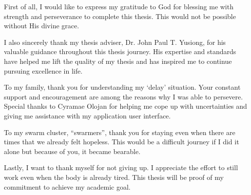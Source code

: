 
First of all, I would like to express my gratitude to God for blessing me with strength and perseverance to complete this thesis. This would not be possible without His divine grace. 

I also sincerely thank my thesis adviser, Dr. John Paul T. Yusiong, for his valuable guidance throughout this thesis journey. His expertise and standards have helped me lift the quality of my thesis and has inspired me to continue pursuing excellence in life. 

To my family, thank you for understanding my `delay' situation. Your constant support and encouragement are among the reasons why I was able to persevere. Special thanks to Cyramae Olojan for helping me cope up with uncertainties and giving me assistance with my application user interface.

To my swarm cluster, “swarmers”, thank you for staying even when there are times that we already felt hopeless. This would be a difficult journey if I did it alone but because of you, it became bearable. 

Lastly, I want to thank myself for not giving up. I appreciate the effort to still work even when the body is already tired. This thesis will be proof of my commitment to achieve my academic goal. 
